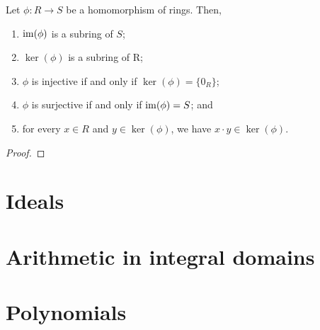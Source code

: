 \begin{prop}
Let $ \phi:R\to S $ be a homomorphism of rings. Then,
\begin{enumerate}
    \item $ \operatorname{im}(\phi) $ is a subring of $ S $;
    \item $ \ker(\phi) $ is a subring of R;
    \item $ \phi $ is injective if and only if $ \ker(\phi)=\{0_R\} $;
    \item $ \phi $ is surjective if and only if $ \operatorname{im}(\phi)=S $; and
    \item for every $ x\in R $ and $ y\in\ker(\phi) $, we have $ x\cdot y\in\ker(\phi) $.
\end{enumerate}
\end{prop}
\begin{proof}
\end{proof}

\section{Ideals}

\section{Arithmetic in integral domains}

\section{Polynomials}

